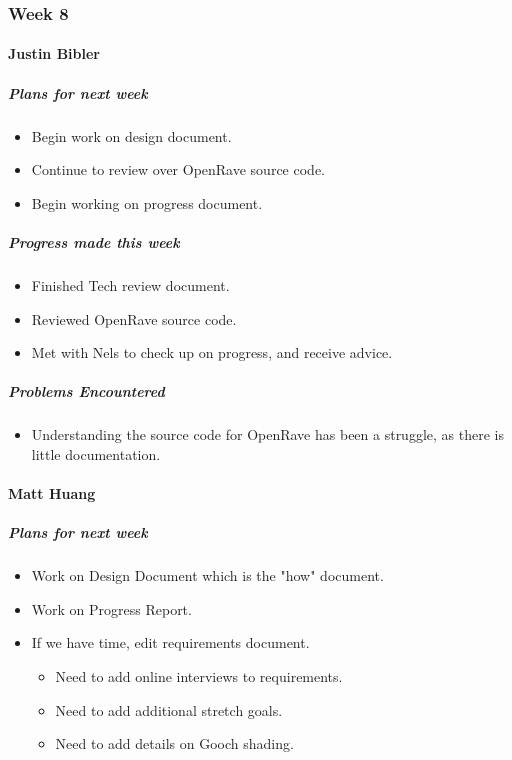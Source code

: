 \newpage

{
\subsubsection{Week 8}
\paragraph{Justin Bibler}
\subparagraph{Plans for next week}
\begin{itemize}
  \item Begin work on design document.
  \item Continue to review over OpenRave source code.
  \item Begin working on progress document.
\end{itemize}

\subparagraph{Progress made this week}
\begin{itemize}
  \item Finished Tech review document.
  \item Reviewed OpenRave source code.
  \item Met with Nels to check up on progress, and receive advice.
\end{itemize}

\subparagraph{Problems Encountered}
\begin{itemize}
  \item Understanding the source code for OpenRave has been a struggle, as there is little documentation.
\end{itemize}

\vspace{3mm}

\paragraph{Matt Huang}
\subparagraph{Plans for next week}
\begin{itemize}
  \item Work on Design Document which is the "how" document.
  \item Work on Progress Report.
  \item If we have time, edit requirements document.
  \begin{itemize}
    \item Need to add online interviews to requirements.
    \item Need to add additional stretch goals.
    \item Need to add details on Gooch shading.
  \end{itemize}
\end{itemize}

}
